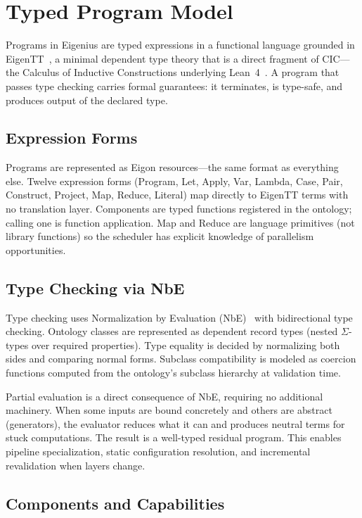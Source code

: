 \documentclass[10pt,twocolumn,letterpaper]{article}
\begin{document}
\section{Typed Program Model}
\label{sec:programs}

Programs in Eigenius are typed expressions in a functional language grounded in EigenTT~\cite{minitt}, a minimal dependent type theory that is a direct fragment of CIC---the Calculus of Inductive Constructions underlying Lean~4~\cite{lean4}.
A program that passes type checking carries formal guarantees: it terminates, is type-safe, and produces output of the declared type.

\subsection{Expression Forms}

Programs are represented as Eigon resources---the same format as everything else.
Twelve expression forms (Program, Let, Apply, Var, Lambda, Case, Pair, Construct, Project, Map, Reduce, Literal) map directly to EigenTT terms with no translation layer.
Components are typed functions registered in the ontology; calling one is function application.
Map and Reduce are language primitives (not library functions) so the scheduler has explicit knowledge of parallelism opportunities.

\subsection{Type Checking via NbE}

Type checking uses Normalization by Evaluation (NbE)~\cite{nbe} with bidirectional type checking.
Ontology classes are represented as dependent record types (nested $\Sigma$-types over required properties).
Type equality is decided by normalizing both sides and comparing normal forms.
Subclass compatibility is modeled as coercion functions computed from the ontology's subclass hierarchy at validation time.

Partial evaluation is a direct consequence of NbE, requiring no additional machinery.
When some inputs are bound concretely and others are abstract (generators), the evaluator reduces what it can and produces neutral terms for stuck computations.
The result is a well-typed residual program.
This enables pipeline specialization, static configuration resolution, and incremental revalidation when layers change.

\subsection{Components and Capabilities}
\end{document}
